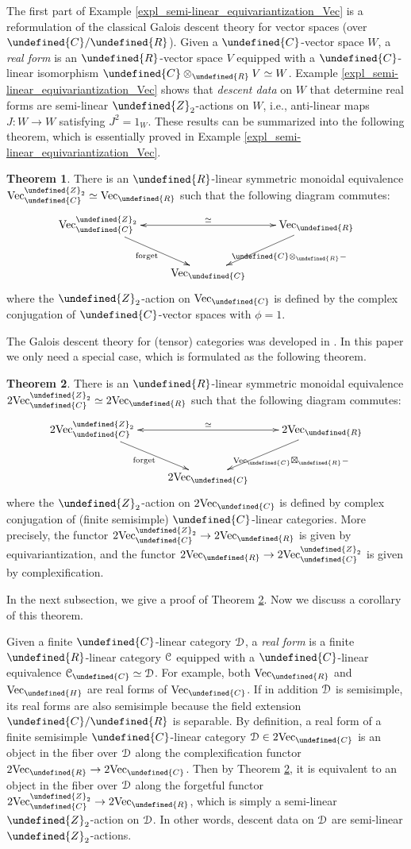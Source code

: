 \documentclass[10pt]{article}
\let\mathbb\undefined
\theoremstyle{definition}
\newtheorem{thm}{Theorem}[section]
\numberwithin{equation}{section}
\numberwithin{thm}{section}
\newcommand{\Cb}{\mathbb{C}}
\newcommand{\Hb}{\mathbb{H}}
\newcommand{\Rb}{\mathbb{R}}
\newcommand{\Zb}{\mathbb{Z}}
\newcommand{\CC}{\EuScript{C}}
\newcommand{\CD}{\EuScript{D}}
\newcommand{\vect}{\mathrm{Vec}}
\begin{document}
The first part of Example \ref{expl_semi-linear_equivariantization_Vec} is a reformulation of the classical Galois descent theory for vector spaces (over $\Cb/\Rb$). Given a $\Cb$-vector space $W$, a \emph{real form} is an $\Rb$-vector space $V$ equipped with a $\Cb$-linear isomorphism $\Cb \otimes_\Rb V \simeq W$. Example \ref{expl_semi-linear_equivariantization_Vec} shows that \emph{descent data} on $W$ that determine real forms are semi-linear $\Zb_2$-actions on $W$, i.e., anti-linear maps $J \colon W \to W$ satisfying $J^2 = 1_W$. These results can be summarized into the following theorem, which is essentially proved in Example \ref{expl_semi-linear_equivariantization_Vec}.

\begin{thm}
There is an $\Rb$-linear symmetric monoidal equivalence $\vect_\Cb^{\Zb_2} \simeq \vect_\Rb$ such that the following diagram commutes:
\[
\xymatrix{
\vect_\Cb^{\Zb_2} \ar@{<->}[rr]^-{\simeq} \ar[dr]_{\text{forget}} & & \vect_\Rb \ar[dl]^{\Cb \otimes_\Rb -} \\
 & \vect_\Cb
}
\]
where the $\Zb_2$-action on $\vect_\Cb$ is defined by the complex conjugation of $\Cb$-vector spaces with $\phi = 1$.
\end{thm}

The Galois descent theory for (tensor) categories was developed in \cite{EG11}. In this paper we only need a special case, which is formulated as the following theorem.

\begin{thm} \label{thm_Galois_descent_category}
There is an $\Rb$-linear symmetric monoidal equivalence $2\vect_\Cb^{\Zb_2} \simeq 2\vect_\Rb$ such that the following diagram commutes:
\[
\xymatrix{
2\vect_\Cb^{\Zb_2} \ar@{<->}[rr]^-{\simeq} \ar[dr]_{\text{forget}} & & 2\vect_\Rb \ar[dl]^{\vect_\Cb \boxtimes_\Rb -} \\
 & 2\vect_\Cb
}
\]
where the $\Zb_2$-action on $2\vect_\Cb$ is defined by complex conjugation of (finite semisimple) $\Cb$-linear categories. More precisely, the functor $2\vect_\Cb^{\Zb_2} \to 2\vect_\Rb$ is given by equivariantization, and the functor $2\vect_\Rb \to 2\vect_\Cb^{\Zb_2}$ is given by complexification.
\end{thm}

In the next subsection, we give a proof of Theorem \ref{thm_Galois_descent_category}. Now we discuss a corollary of this theorem.

Given a finite $\Cb$-linear category $\CD$, a \emph{real form} is a finite $\Rb$-linear category $\CC$ equipped with a $\Cb$-linear equivalence $\CC_\Cb \simeq \CD$. For example, both $\vect_\Rb$ and $\vect_\Hb$ are real forms of $\vect_\Cb$. If in addition $\CD$ is semisimple, its real forms are also semisimple because the field extension $\Cb/\Rb$ is separable. By definition, a real form of a finite semisimple $\Cb$-linear category $\CD \in 2\vect_\Cb$ is an object in the fiber over $\CD$ along the complexification functor $2\vect_\Rb \to 2\vect_\Cb$. Then by Theorem \ref{thm_Galois_descent_category}, it is equivalent to an object in the fiber over $\CD$ along the forgetful functor $2\vect_\Cb^{\Zb_2} \to 2\vect_\Rb$, which is simply a semi-linear $\Zb_2$-action on $\CD$. In other words, descent data on $\CD$ are semi-linear $\Zb_2$-actions.
\end{document}
